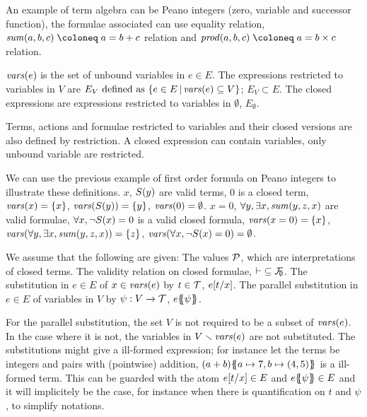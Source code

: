\documentclass{article}
\begin{document}
An example of term algebra can be Peano integers (zero, variable and successor function), the formulae associated can use equality relation, \(\mathit{sum}\mpar{a, b, c} \defobject a = b + c\) relation and \(\mathit{prod}\mpar{a, b, c} \defobject a = b \times c\) relation.

\begin{defi}
 \(\mathit{vars}{\left(e\right)}\) is the set of unbound variables in \(e \in E\).
 The expressions restricted to variables in \(V\) are \(E_V \text{ defined as } {\left\{e \in E\,\middle|\,\mathit{vars}{\left(e\right)} \subseteq V\right\}}\); \(E_V \subset E\).
 The closed expressions are expressions restricted to variables in \(\emptyset\), \(E_\emptyset\).
\end{defi}
Terms, actions and formulae restricted to variables and their closed versions are also defined by restriction.
A closed expression can contain variables, only unbound variable are restricted.

We can use the previous example of first order formula on Peano integers to illustrate these definitions.
\(x\), \(S{\left(y\right)}\) are valid terms, \(0\) is a closed term, \(\mathit{vars}{\left(x\right)} = {\left\{x\right\}}\), \(\mathit{vars}{\left(S{\left(y\right)}\right)} = {\left\{y\right\}}\), \(\mathit{vars}{\left(0\right)} = \emptyset\).
\(x = 0\), \(\forall y, \exists x, \mathit{sum}{\left(y, z, x\right)}\) are valid formulae, \(\forall x, \neg S{\left(x\right)} = 0\) is a valid closed formula, \(\mathit{vars}{\left(x = 0\right)} = {\left\{x\right\}}\), \(\mathit{vars}{\left(\forall y, \exists x, \mathit{sum}{\left(y, z, x\right)}\right)} = {\left\{z\right\}}\), \(\mathit{vars}{\left(\forall x, \neg S{\left(x\right)} = 0\right)} = \emptyset\).

\begin{defi}
We assume that the following are given:
 The values \(\mathcal{P}\), which are interpretations of closed terms.
 The validity relation on closed formulae, \({\vdash} \subseteq {\mathcal{F}}_{\!\!\emptyset}\).
 The substitution in \(e \in E\) of \(x \in \mathit{vars}{\left(e\right)}\) by \(t \in {\mathcal{T}}\), \(e{\left[t\middle/x\right]}\).
 The parallel substitution in \(e \in E\) of variables in \(V\) by \(\psi: V \to {\mathcal{T}}\), \(e{\left\{\!\!{\left\{\psi\right\}}\!\!\right\}}\).
\end{defi}
For the parallel substitution, the set \(V\) is not required to be a subset of \(\mathit{vars}{\left(e\right)}\).
In the case where it is not, the variables in \(V \smallsetminus \mathit{vars}{\left(e\right)}\) are not substituted.
The substitutions might give a ill-formed expression; for instance let the terms be integers and pairs with (pointwise) addition, \({\left(a + b\right)}{\left\{\!\!{\left\{a \mapsto 7, b \mapsto {\left(4, 5\right)}\right\}}\!\!\right\}}\) is a ill-formed term.
This can be guarded with the atom \(e{\left[t\middle/x\right]} \in E\) and \(e{\left\{\!\!{\left\{\psi\right\}}\!\!\right\}} \in E\) and it will implicitely be the case, for instance when there is quantification on \(t\) and \(\psi\), to simplify notations.
\end{document}
